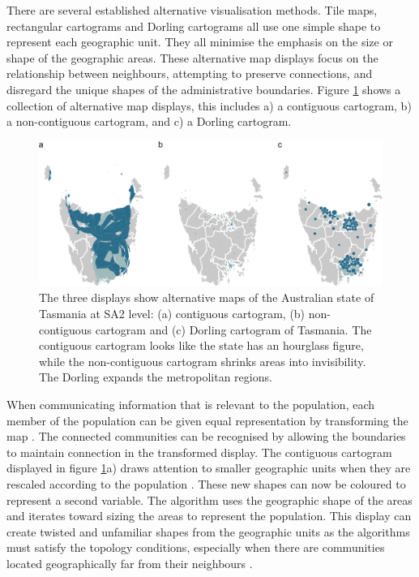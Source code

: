 There are several established alternative visualisation methods. Tile
maps, rectangular cartograms \citep{ORC} and Dorling cartograms
\citep{ACTUC} all use one simple shape to represent each geographic
unit. They all minimise the emphasis on the size or shape of the
geographic areas. These alternative map displays focus on the
relationship between neighbours, attempting to preserve connections, and
disregard the unique shapes of the administrative boundaries. Figure
\ref{fig:tas_displays} shows a collection of alternative map displays,
this includes a) a contiguous cartogram, b) a non-contiguous cartogram,
and c) a Dorling cartogram.

\begin{Schunk}
\begin{figure}
\includegraphics[width=0.95\linewidth]{kobakian-cook_files/figure-latex/tas_displays-1} \caption[The three displays show alternative maps of the Australian state of Tasmania at SA2 level]{The three displays show alternative maps of the Australian state of Tasmania at SA2 level: (a) contiguous cartogram, (b) non-contiguous cartogram and (c) Dorling cartogram of Tasmania. The contiguous cartogram looks like the state has an hourglass figure, while the non-contiguous cartogram shrinks areas into invisibility. The Dorling expands the metropolitan regions.}\label{fig:tas_displays}
\end{figure}
\end{Schunk}

When communicating information that is relevant to the population, each
member of the population can be given equal representation by
transforming the map \citep{TVSSS}. The connected communities can be
recognised by allowing the boundaries to maintain connection in the
transformed display. The contiguous cartogram displayed in figure
\ref{fig:tas_displays}a) draws attention to smaller geographic units
when they are rescaled according to the population \citep{DMAHP}. These
new shapes can now be coloured to represent a second variable. The
algorithm uses the geographic shape of the areas and iterates toward
sizing the areas to represent the population. This display can create
twisted and unfamiliar shapes from the geographic units as the
algorithms must satisfy the topology conditions, especially when there
are communities located geographically far from their neighbours
\citep{TVSSS}.

